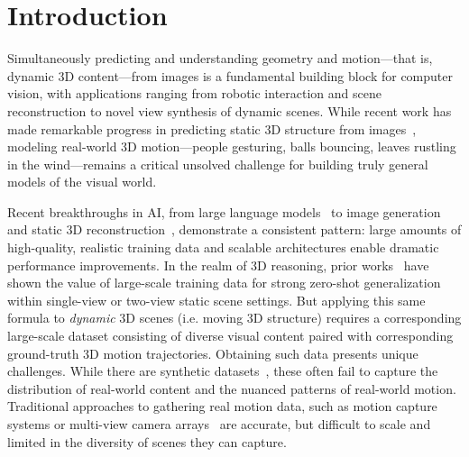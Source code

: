 \section{Introduction}
\label{sec:intro}

Simultaneously predicting and understanding geometry and motion---that is, dynamic 3D content---from images is a fundamental building block for computer vision, with applications ranging from robotic interaction and scene reconstruction to novel view synthesis of dynamic scenes. 
While recent work has made remarkable progress in predicting static 3D structure from images~\citep{wang2024dust3r,yang2024depth,bochkovskii2024depth}, modeling real-world 3D motion---people gesturing, balls bouncing, leaves rustling in the wind---remains a critical unsolved challenge for building truly general models of the visual world.

Recent breakthroughs in AI, from 
large language models~\cite{achiam2023gpt,team2023gemini} to 
image generation~\cite{polyak2024movie} and 
static 3D reconstruction~\cite{wang2024dust3r,bochkovskii2024depth,yang2024depth}, 
demonstrate a consistent pattern: large amounts of high-quality, realistic training data and scalable architectures enable dramatic performance improvements. 
In the realm of 3D reasoning, prior works~\cite{li2018megadepth, depthanything, ranftl2020towards, ranftl2021vision, wang2024dust3r} have shown the value of large-scale training data for strong zero-shot generalization within single-view or two-view static scene settings.
But applying this same formula to \emph{dynamic} 3D scenes (i.e. moving 3D structure) requires a corresponding large-scale dataset consisting of diverse visual content paired with corresponding ground-truth 3D motion trajectories. 
Obtaining such data presents unique challenges. While there are synthetic datasets~\cite{zheng2023point,butler2012naturalistic,dosovitskiy2015flownet,greff2021kubric}, these often fail to capture the distribution of real-world content and the nuanced patterns of real-world motion. 
Traditional approaches to gathering real motion data, such as motion capture systems or multi-view camera arrays~\cite{Joo_2015_ICCV,Grauman_2024_CVPR,kirschstein2023nersemble,isik2023humanrf}
are accurate, but difficult to scale and limited in the diversity of scenes they can capture. 

